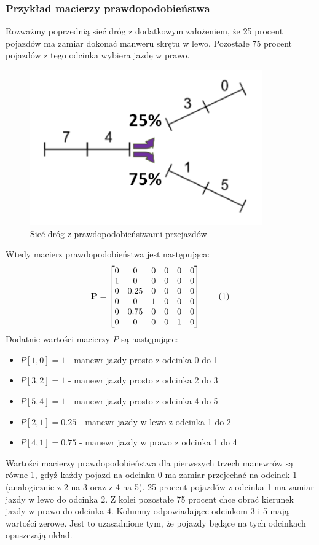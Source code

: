 \documentclass[12pt]{book}
\theoremstyle{plain}
\newcommand\addtag{\refstepcounter{equation}
\renewcommand{\labelenumii}{\theenumii}
\renewcommand{\theenumii}{\theenumi.\arabic{enumii}.}
\tag{\theequation}}
\begin{document}
\subsubsection*{Przykład macierzy prawdopodobieństwa} \label{sec:p_example}
Rozważmy poprzednią sieć dróg z dodatkowym założeniem, że 25 procent pojazdów ma zamiar dokonać manweru skrętu w lewo. Pozostałe 75 procent pojazdów z tego odcinka wybiera jazdę w prawo.
\begin{figure}[H]
	\centering
	\includegraphics[width=10cm]{images/env_11_743015_procenty}
	\caption{Sieć dróg z prawdopodobieństwami przejazdów}
	\label{fig:3_single_road}
\end{figure}Wtedy macierz prawdopodobieństwa jest następująca:
\def \P {\begin{bmatrix}
		0 & 0 & 0 & 0 & 0 & 0 \\
		1 & 0 & 0 & 0 & 0 & 0 \\
		0 & 0.25 & 0 & 0 & 0 & 0 \\
		0 & 0 & 1 & 0 & 0 & 0 \\
		0 & 0.75 & 0 & 0 & 0 & 0 \\
		0 & 0 & 0 & 0 & 1 & 0 
\end{bmatrix}}
\[\textbf{P}=\P \addtag \label{eq:p_example} \]
Dodatnie wartości macierzy $P$ są następujące:
\begin{itemize}
	\item $P[1,0]=1$ - manewr jazdy prosto z odcinka 0 do 1
	\item $P[3,2]=1$ - manewr jazdy prosto z odcinka 2 do 3
	\item $P[5,4]=1$ - manewr jazdy prosto z odcinka 4 do 5
	\item $P[2,1]=0.25$ - manewr jazdy w lewo z odcinka 1 do 2
	\item $P[4,1]=0.75$ - manewr jazdy w prawo z odcinka 1 do 4
\end{itemize}
Wartości macierzy prawdopodobieństwa dla pierwszych trzech manewrów są równe 1, gdyż każdy pojazd na odcinku 0 ma zamiar przejechać na odcinek 1 (analogicznie z 2 na 3 oraz z 4 na 5). 25 procent pojazdów z odcinka 1 ma zamiar jazdy w lewo do odcinka 2. Z kolei pozostałe 75 procent chce obrać kierunek jazdy w prawo do odcinka 4. Kolumny odpowiadające odcinkom 3 i 5 mają wartości zerowe. Jest to uzasadnione tym, że pojazdy będące na tych odcinkach opuszczają układ.
\end{document}
